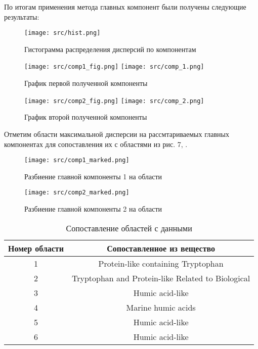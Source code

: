 \documentclass[a4paper]{article}
\begin{document}
По итогам применения метода главных компонент были получены следующие результаты:
\begin{figure}[H]
    \centering
    \texttt{[image: src/hist.png]}
    \caption{Гистограмма распределения дисперсий по компонентам}
    \label{fig:hist}
\end{figure}
\begin{figure}[H]
    \centering
    \texttt{[image: src/comp1\_fig.png]}
    \texttt{[image: src/comp\_1.png]}
    \caption{График первой полученной компоненты}
    \label{fig:comp_1}
\end{figure}
\begin{figure}[H]
    \centering
    \texttt{[image: src/comp2\_fig.png]}
    \texttt{[image: src/comp\_2.png]}
    \caption{График второй полученной компоненты}
    \label{fig:comp_2}
\end{figure}
Отметим области максимальной дисперсии на рассмтариваемых главных компонентах для сопоставления их с областями из рис. 7, \cite{article1}.
\begin{figure}[H]
    \centering
    \texttt{[image: src/comp1\_marked.png]}
    \caption{Разбиение главной компоненты 1 на области}
    \label{fig:comp1_marked}
\end{figure}
\begin{figure}[H]
    \centering
    \texttt{[image: src/comp2\_marked.png]}
    \caption{Разбиение главной компоненты 2 на области}
    \label{fig:comp2_marked}
\end{figure}
\begin{table}[H]
    \centering
    \begin{tabular}{|c|c|}
        \hline
        Номер области & Сопоставленное из \cite{article1} вещество\\
        \hline  
        1&Protein-like containing Tryptophan\\
        \hline
        2&Tryptophan and Protein-like Related to Biological\\
        \hline
        3&Humic acid-like\\
        \hline
        4&Marine humic acids\\
        \hline
        5&Humic acid-like\\
        \hline
        6&Humic acid-like\\
        \hline
    \end{tabular}
    \caption{Сопоставление областей с данными}
    \label{tab:marked_regions}
\end{table}
\end{document}
